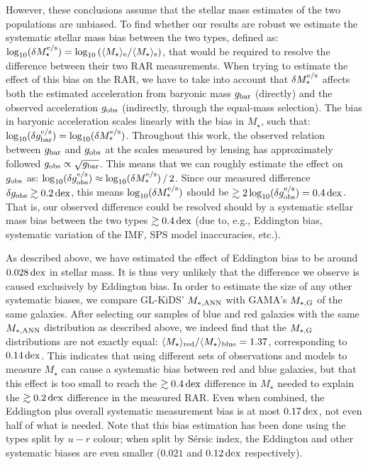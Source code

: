 \documentclass[usenatbib]{mnras}
\newcommand{\un}[1]{_{\rm #1}}
\newcommand{\dex}{\, {\rm dex}}
\begin{document}
However, these conclusions assume that the stellar mass estimates of the two populations are unbiased. To find whether our results are robust we estimate the systematic stellar mass bias between the two types, defined as: $\log_{10}(\delta M_\star^{\rm e/s}) = \log_{10}\left( \langle M_\star\rangle\un{e} / \langle M_\star\rangle\un{s} \right)$, that would be required to resolve the difference between their two RAR measurements. When trying to estimate the effect of this bias on the RAR, we have to take into account that $\delta M^{\rm e/s}_*$ affects both the estimated acceleration from baryonic mass $g\un{bar}$ (directly) and the observed acceleration $g\un{obs}$ (indirectly, through the equal-mass selection). The bias in baryonic acceleration scales linearly with the bias in $M_\star$, such that: $\log_{10}(\delta g^{\rm e/s}\un{bar}) = \log_{10}(\delta M^{\rm e/s}_*)$. Throughout this work, the observed relation between $g\un{bar}$ and $g\un{obs}$ at the scales measured by lensing has approximately followed $g\un{obs} \propto \sqrt{g\un{bar}}$. This means that we can roughly estimate the effect on $g\un{obs}$ as: $\log_{10}(\delta g^{\rm e/s}\un{obs}) \approx {\log_{10}(\delta M^{\rm e/s}_*)} \, / \, {2}$. Since our measured difference $\delta g\un{obs} \gtrsim 0.2 \dex$, this means ${\log_{10}(\delta M^{\rm e/s}_*)}$ should be  $\gtrsim 2 \log_{10}(\delta g^{\rm e/s}\un{obs}) = 0.4 \dex$. That is, our observed difference could be resolved should by a systematic stellar mass bias between the two types $\gtrsim 0.4 \dex$ (due to, e.g., Eddington bias, systematic variation of the IMF, SPS model inaccuracies, etc.).

As described above, we have estimated the effect of Eddington bias to be around $0.028 \dex$ in stellar mass. It is thus very unlikely that the difference we observe is caused exclusively by Eddington bias. In order to estimate the size of any other systematic biases, we compare GL-KiDS' $M\un{*,ANN}$ with GAMA's $M\un{*,G}$ of the same galaxies. After selecting our samples of blue and red galaxies with the same $M\un{*,ANN}$ distribution as described above, we indeed find that the $M\un{*,G}$ distributions are not exactly equal: $\langle M_\star \rangle\un{red} / \langle M_\star\rangle\un{blue} = 1.37$, corresponding to $0.14 \dex$. This indicates that using different sets of observations and models to measure $M_\star$ can cause a systematic bias between red and blue galaxies, but that this effect is too small to reach the $\gtrsim 0.4 \dex$ difference in $M_\star$ needed to explain the $\gtrsim 0.2 \dex$ difference in the measured RAR. Even when combined, the Eddington plus overall systematic measurement bias is at most $0.17 \dex$, not even half of what is needed. Note that this bias estimation has been done using the types split by $u-r$ colour; when split by S\'ersic index, the Eddington and other systematic biases are even smaller ($0.021$ and $0.12 \dex$ respectively).
\end{document}
